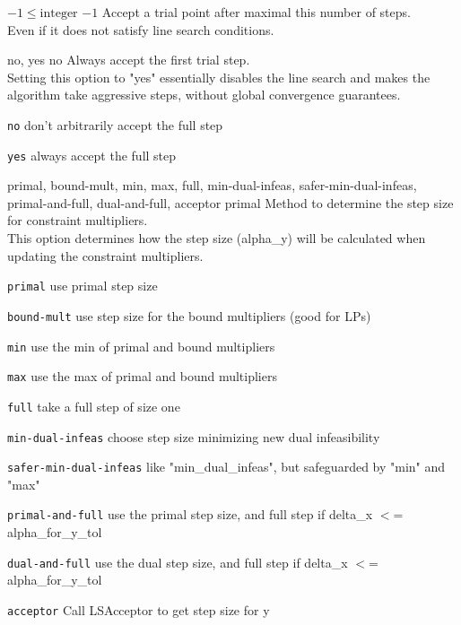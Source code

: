 %
{$-1\leq\textrm{integer}$}%
{$-1$}%
{Accept a trial point after maximal this number of steps.\\
Even if it does not satisfy line search conditions.}%
{}

%
{\ttfamily no, yes}%
{no}%
{Always accept the first trial step.\\
Setting this option to "yes" essentially disables the line search and makes the algorithm take aggressive steps, without global convergence guarantees.}%
{\begin{list}{}{
\setlength{\parsep}{0em}
\setlength{\leftmargin}{5ex}
\setlength{\labelwidth}{2ex}
\setlength{\itemindent}{0ex}
\setlength{\topsep}{0pt}}
\item[\texttt{no}] don't arbitrarily accept the full step
\item[\texttt{yes}] always accept the full step
\end{list}
}

%
{\ttfamily primal, bound-mult, min, max, full, min-dual-infeas, safer-min-dual-infeas, primal-and-full, dual-and-full, acceptor}%
{primal}%
{Method to determine the step size for constraint multipliers.\\
This option determines how the step size (alpha\_y) will be calculated when updating the constraint multipliers.}%
{\begin{list}{}{
\setlength{\parsep}{0em}
\setlength{\leftmargin}{5ex}
\setlength{\labelwidth}{2ex}
\setlength{\itemindent}{0ex}
\setlength{\topsep}{0pt}}
\item[\texttt{primal}] use primal step size
\item[\texttt{bound-mult}] use step size for the bound multipliers (good for LPs)
\item[\texttt{min}] use the min of primal and bound multipliers
\item[\texttt{max}] use the max of primal and bound multipliers
\item[\texttt{full}] take a full step of size one
\item[\texttt{min-dual-infeas}] choose step size minimizing new dual infeasibility
\item[\texttt{safer-min-dual-infeas}] like "min\_dual\_infeas", but safeguarded by "min" and "max"
\item[\texttt{primal-and-full}] use the primal step size, and full step if delta\_x $<$= alpha\_for\_y\_tol
\item[\texttt{dual-and-full}] use the dual step size, and full step if delta\_x $<$= alpha\_for\_y\_tol
\item[\texttt{acceptor}] Call LSAcceptor to get step size for y
\end{list}
}

